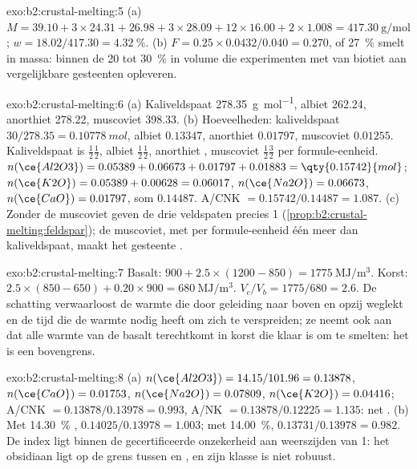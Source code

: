 \begin{solution}{exo:b2:crustal-melting:5}
(a) $M = 39.10 + 3\times24.31 + 26.98 + 3\times28.09 + 12\times16.00 + 2\times1.008 =
\qty{417.30}{\gram\per\mole}$; $w = 18.02/417.30 = \qty{4.32}{\percent}$.
(b) $F = 0.25\times0.0432/0.040 = 0.270$, of \qty{27}{\percent} smelt in massa: binnen de
20 tot \qty{30}{\percent} in volume die experimenten met  van biotiet aan
vergelijkbare gesteenten opleveren.
\end{solution}

\begin{solution}{exo:b2:crustal-melting:6}
(a) Kaliveldspaat \qty{278.35}{\gram\per\mole}, albiet 262.24, anorthiet 278.22, muscoviet
398.33. (b) Hoeveelheden: kaliveldspaat $30/278.35 = \qty{0.10778}{mol}$, albiet $0.13347$,
anorthiet $0.01797$, muscoviet $0.01255$. Kaliveldspaat is $\tfrac12$$\tfrac12$,
albiet $\tfrac12$$\tfrac12$, anorthiet , muscoviet
$\tfrac12$$\tfrac32$ per formule-eenheid. $n(\ce{Al2O3}) = 0.05389 +
0.06673 + 0.01797 + 0.01883 = \qty{0.15742}{mol}$; $n(\ce{K2O}) = 0.05389 + 0.00628 =
0.06017$, $n(\ce{Na2O}) = 0.06673$, $n(\ce{CaO}) = 0.01797$, som $0.14487$.
A/CNK $= 0.15742/0.14487 = 1.087$. (c) Zonder de muscoviet geven de drie veldspaten
precies 1 (\cref{prop:b2:crustal-melting:feldspar}); de muscoviet, met per formule-eenheid één 
meer dan kaliveldspaat, maakt het gesteente .
\end{solution}

\begin{solution}{exo:b2:crustal-melting:7}
Basalt: $900 + 2.5\times(1200 - 850) = \qty{1775}{\mega\joule\per\cubic\metre}$. Korst:
$2.5\times(850 - 650) + 0.20\times900 = \qty{680}{\mega\joule\per\cubic\metre}$.
$V_c/V_b = 1775/680 = 2.6$. De schatting verwaarloost de warmte die door geleiding naar boven
en opzij weglekt en de tijd die de warmte nodig heeft om zich te verspreiden; ze neemt ook aan dat alle
warmte van de basalt terechtkomt in korst die klaar is om te smelten: het is een bovengrens.
\end{solution}

\begin{solution}{exo:b2:crustal-melting:8}
(a) $n(\ce{Al2O3}) = 14.15/101.96 = 0.13878$, $n(\ce{CaO}) = 0.01753$, $n(\ce{Na2O}) =
0.07809$, $n(\ce{K2O}) = 0.04416$; A/CNK $= 0.13878/0.13978 = 0.993$, A/NK $=
0.13878/0.12225 = 1.135$: net . (b) Met \qty{14.30}{\percent} ,
$0.14025/0.13978 = 1.003$; met \qty{14.00}{\percent}, $0.13731/0.13978 = 0.982$. De index
ligt binnen de gecertificeerde onzekerheid aan weerszijden van 1: het obsidiaan ligt op de
grens tussen  en , en zijn klasse is niet robuust.
\end{solution}

